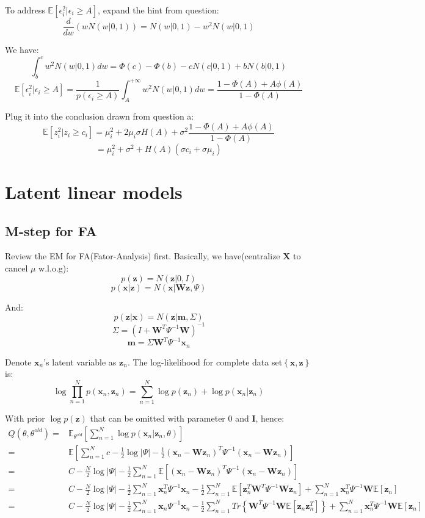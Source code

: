 \documentclass[UTF8]{ctexart}
\begin{document}
To address $\mathbb{E}[\epsilon_{i}^{2}|\epsilon_{i} \geq A]$, expand the hint from question:
$$\frac{d}{dw}(wN(w|0,1))=N(w|0,1)-w^{2}N(w|0,1)$$

We have:
$$\int_{b}^{c}w^{2}N(w|0,1)dw=\Phi(c)-\Phi(b)-cN(c|0,1)+bN(b|0,1)$$
$$\mathbb{E}[\epsilon_{i}^{2}|\epsilon_{i} \geq A]=\frac{1}{p(\epsilon_{i}\geq A)}\int_{A}^{+\infty}w^{2}N(w|0,1)dw=\frac{1-\Phi(A)+A\phi(A)}{1-\Phi(A)}$$

Plug it into the conclusion drawn from question a:
$$\mathbb{E}[z_{i}^{2}|z_{i} \geq c_{i}]=\mu_{i}^{2}+2\mu_{i}\sigma H(A) + \sigma^{2}\frac{1-\Phi(A)+A\phi(A)}{1-\Phi(A)}$$
$$=\mu_{i}^{2} + \sigma^{2} + H(A)(\sigma c_{i} + \sigma \mu_{i})$$

\newpage
\section{Latent linear models}
\subsection{M-step for FA}
Review the EM for FA(Fator-Analysis) first. Basically, we have(centralize $\textbf{X}$ to cancel $\mu$ w.l.o.g):
$$p(\textbf{z})=N(\textbf{z}|0,I)$$
$$p(\textbf{x}|\textbf{z})=N(\textbf{x}|\textbf{W}\textbf{z},\Psi)$$

And:
$$p(\textbf{z}|\textbf{x})=N(\textbf{z}|\textbf{m},\Sigma)$$
$$\Sigma=(I+\textbf{W}^{T}\Psi^{-1}\textbf{W})^{-1}$$
$$\textbf{m}=\Sigma\textbf{W}^{T}\Psi^{-1}\textbf{x}_{n}$$

Denote $\textbf{x}_{n}$'s latent variable as $\textbf{z}_{n}$. The log-likelihood for complete data set$\left\{ \textbf{x},\textbf{z} \right\}$ is:
$$\log \prod_{n=1}^{N}p(\textbf{x}_{n},\textbf{z}_{n})=\sum_{n=1}^{N}\log p(\textbf{z}_{n})+\log p(\textbf{x}_{n}|\textbf{z}_{n})$$

With prior $\log p(\textbf{z})$ that can be omitted with parameter $0$ and $\textbf{I}$, hence:
\begin{align}
Q(\theta,\theta^{old})=&\mathbb{E}_{\theta^{old}}[\sum_{n=1}^{N}\log p(\textbf{x}_{n}|\textbf{z}_{n},\theta)]\nonumber \\
=&\mathbb{E}[\sum_{n=1}^{N} c-\frac{1}{2}\log |\Psi|-\frac{1}{2}(\textbf{x}_{n}-\textbf{W}\textbf{z}_{n})^{T}\Psi^{-1}(\textbf{x}_{n}-\textbf{W}\textbf{z}_{n})]\nonumber \\
=&C -\frac{N}{2}\log |\Psi|-\frac{1}{2}\sum_{n=1}^{N}\mathbb{E}[(\textbf{x}_{n}-\textbf{W}\textbf{z}_{n})^{T}\Psi^{-1}(\textbf{x}_{n}-\textbf{W}\textbf{z}_{n})]\nonumber \\
=&C-\frac{N}{2}\log |\Psi|-\frac{1}{2}\sum_{n=1}^{N}\textbf{x}_{n}^{T}\Psi^{-1}\textbf{x}_{n}-\frac{1}{2}\sum_{n=1}^{N}\mathbb{E}[\textbf{z}_{n}^{T}\textbf{W}^{T}\Psi^{-1}\textbf{W}\textbf{z}_{n}]+\sum_{n=1}^{N}\textbf{x}_{n}^{T}\Psi^{-1}\textbf{W}\mathbb{E}[\textbf{z}_{n}]\nonumber \\
=&C-\frac{N}{2}\log |\Psi|-\frac{1}{2}\sum_{n=1}^{N}\textbf{x}_{n}\Psi^{-1}\textbf{x}_{n}-\frac{1}{2}\sum_{n=1}^{N}Tr\left\{ \textbf{W}^{T}\Psi^{-1}\textbf{W}\mathbb{E}[\textbf{z}_{n}\textbf{z}_{n}^{T}]\right\} +\sum_{n=1}^{N}\textbf{x}_{n}^{T}\Psi^{-1}\textbf{W}\mathbb{E}[\textbf{z}_{n}]\nonumber 
\end{align}
\end{document}
